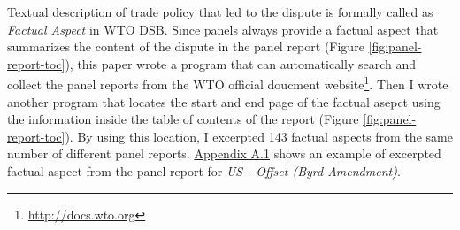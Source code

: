 Textual description of trade policy that 
led to the dispute is formally called as
\textit{Factual Aspect} in WTO DSB. 
Since panels
always provide a factual aspect
that summarizes the content of the dispute
in the panel report (Figure \ref{fig:panel-report-toc}),
this paper wrote a program that can 
automatically search and collect 
the panel reports from the WTO official doucment website\footnote{
    \url{http://docs.wto.org}
}.
Then I wrote another program that locates the start 
and end page of the factual asepct using the information inside the 
table of contents of the report (Figure \ref{fig:panel-report-toc}).
By using this location, I excerpted 143 factual aspects 
from the same number of different panel reports. 
\hyperref[sub:factual-aspect-example]{Appendix A.1} shows an
example of excerpted factual aspect from the panel report for \textit{US - Offset (Byrd Amendment)}.




